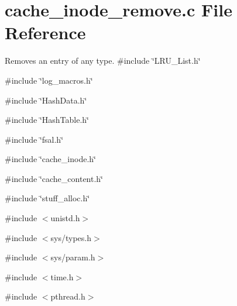 \section{cache\_\-inode\_\-remove.c File Reference}
\label{cache__inode__remove_8c}


Removes an entry of any type.  
{\ttfamily \#include \char`\"{}LRU\_\-List.h\char`\"{}}\par
{\ttfamily \#include \char`\"{}log\_\-macros.h\char`\"{}}\par
{\ttfamily \#include \char`\"{}HashData.h\char`\"{}}\par
{\ttfamily \#include \char`\"{}HashTable.h\char`\"{}}\par
{\ttfamily \#include \char`\"{}fsal.h\char`\"{}}\par
{\ttfamily \#include \char`\"{}cache\_\-inode.h\char`\"{}}\par
{\ttfamily \#include \char`\"{}cache\_\-content.h\char`\"{}}\par
{\ttfamily \#include \char`\"{}stuff\_\-alloc.h\char`\"{}}\par
{\ttfamily \#include $<$unistd.h$>$}\par
{\ttfamily \#include $<$sys/types.h$>$}\par
{\ttfamily \#include $<$sys/param.h$>$}\par
{\ttfamily \#include $<$time.h$>$}\par
{\ttfamily \#include $<$pthread.h$>$}\par
